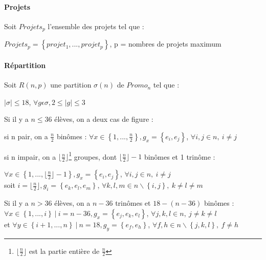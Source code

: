\documentclass[10pt,a4paper]{scrartcl}
\begin{document}
\paragraph{Projets}Soit $Projets_{p}$ l'ensemble des projets tel que : \\
\begin{center}
	$Projets_{p}=\left\{ projet_{1}, ..., projet_{p} \right\}$, p = nombres de projets maximum
\end{center}

\paragraph{Répartition}Soit $R(n,p)$ une partition $\sigma(n)$ de $Promo_{n}$ tel que : \\
\begin{center}
	$|\sigma|\leq18$, $\forall g\epsilon\sigma , 2\leq |g| \leq3$
\end{center}
Si il y a $n \leqslant 36$ élèves, on a deux cas de figure : \\
\begin{itemize}
	\begin{item}
		si n pair, on a $\frac{n}{2}$ binômes :  $\forall x \in \left\{ 1, ..., \frac{n}{2} \right\}, g_{x} = \left\{ e_{i}, e_{j} \right\}$, $\forall i, j \in n,\ i \neq j$
	\end{item}
	\begin{item}
		si n impair, on a  $\lfloor \frac{n}{2} \rfloor$\footnote{$\lfloor \frac{n}{2} \rfloor$ est la partie entière de $\frac{n}{2}$} groupes, dont $\lfloor \frac{n}{2} \rfloor-1$ binômes et 1 trinôme :
		
		$\forall x \in \left\{ 1, ..., \lfloor \frac{n}{2} \rfloor -1 \right\}, g_{x} = \left\{ e_{i}, e_{j} \right\}$, $\forall i, j \in n,\ i \neq j$ \\
		soit $i=\lfloor \frac{n}{2} \rfloor, g_{i} = \left\{ e_{k}, e_{l}, e_{m} \right\}$, $\forall k, l, m \in n\backslash\left\{ i, j \right\},\ k \neq l \neq m$ \newline
	\end{item}
\end{itemize}

Si il y a $n > 36$ élèves, on a $n-36$ trinômes et $18-(n-36)$ binômes : \\
$\forall x \in \left\{ 1, ..., i \right\} \ | \ i=n-36, g_{x} = \left\{ e_{j}, e_{k}, e_{l} \right\}$, $\forall j, k, l \in n,\ j \neq k \neq l$ \\
et $\forall y \in \left\{ i+1, ..., n \right\} \ | \ n=18, g_{y} = \left\{ e_{f}, e_{h} \right\}$, $\forall f, h \in n\backslash\left\{ j, k, l \right\},\ f \neq h$
\end{document}
